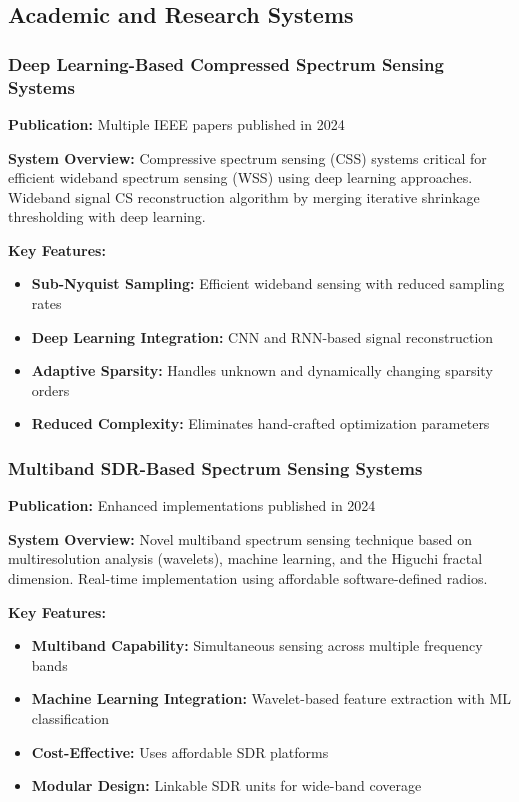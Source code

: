 \documentclass[14pt]{book}
\begin{document}
\subsection{Academic and Research Systems}

\subsubsection{Deep Learning-Based Compressed Spectrum Sensing Systems}
\textbf{Publication:} Multiple IEEE papers published in 2024

\textbf{System Overview:} Compressive spectrum sensing (CSS) systems critical for efficient wideband spectrum sensing (WSS) using deep learning approaches. Wideband signal CS reconstruction algorithm by merging iterative shrinkage thresholding with deep learning.

\textbf{Key Features:}
\begin{itemize}
	\item \textbf{Sub-Nyquist Sampling:} Efficient wideband sensing with reduced sampling rates
	\item \textbf{Deep Learning Integration:} CNN and RNN-based signal reconstruction
	\item \textbf{Adaptive Sparsity:} Handles unknown and dynamically changing sparsity orders
	\item \textbf{Reduced Complexity:} Eliminates hand-crafted optimization parameters
\end{itemize}

\subsubsection{Multiband SDR-Based Spectrum Sensing Systems}
\textbf{Publication:} Enhanced implementations published in 2024

\textbf{System Overview:} Novel multiband spectrum sensing technique based on multiresolution analysis (wavelets), machine learning, and the Higuchi fractal dimension. Real-time implementation using affordable software-defined radios.

\textbf{Key Features:}
\begin{itemize}
	\item \textbf{Multiband Capability:} Simultaneous sensing across multiple frequency bands
	\item \textbf{Machine Learning Integration:} Wavelet-based feature extraction with ML classification
	\item \textbf{Cost-Effective:} Uses affordable SDR platforms
	\item \textbf{Modular Design:} Linkable SDR units for wide-band coverage
\end{itemize}
\end{document}
